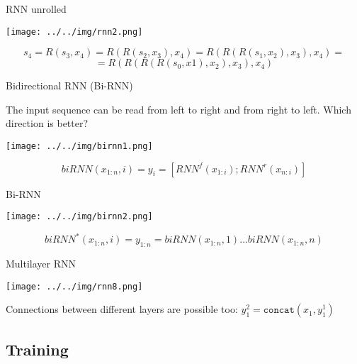 \documentclass[usenames,dvipsnames,handout,aspectratio=169]{beamer}
\begin{document}
\begin{frame}{RNN unrolled}	

    \begin{center}
	\texttt{[image: ../../img/rnn2.png]}
     \end{center}

\[ s_4 = R(s_3, x_4) = R(R(s_2, x_3), x_4) = R(R(R(s_1, x_2), x_3), x_4) =  \]
\[ = R(R(R(R(s_0, x1), x_2), x_3), x_4)\]

\end{frame}

\begin{frame}{Bidirectional RNN (Bi-RNN)}

The input sequence can be read from left to right and from right to left. Which direction is better?	

    \begin{center}
	\texttt{[image: ../../img/birnn1.png]}
     \end{center}

\[biRNN(x_{1:n}, i) = y_i = [RNN^f(x_{1:i}); RNN^r(x_{n:i})]\]
\end{frame}


\begin{frame}{Bi-RNN}	

    \begin{center}
	\texttt{[image: ../../img/birnn2.png]}
     \end{center}

\[biRNN^{*}(x_{1:n}, i) = y_{1:n} = biRNN(x_{1:n}, 1) \ldots biRNN(x_{1:n}, n)\]
\end{frame}

\begin{frame}{Multilayer RNN}	

    \begin{center}
	\texttt{[image: ../../img/rnn8.png]}
     \end{center}


Connections between different layers are possible too: $y_1^2 = \texttt{concat}(x_1, y_1^1)$ 

\end{frame}

\subsection{Training}
\end{document}
